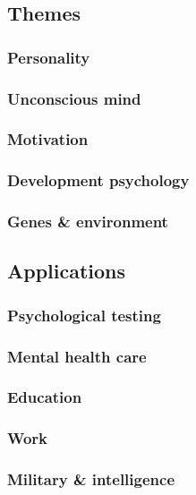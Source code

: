 \documentclass[oneside]{book}
\numberwithin{equation}{section}
\begin{document}
\subsection{Themes}

\subsubsection{Personality}

\subsubsection{Unconscious mind}

\subsubsection{Motivation}

\subsubsection{Development psychology}

\subsubsection{Genes \& environment}

\subsection{Applications}

\subsubsection{Psychological testing}

\subsubsection{Mental health care}

\subsubsection{Education}

\subsubsection{Work}

\subsubsection{Military \& intelligence}
\end{document}
